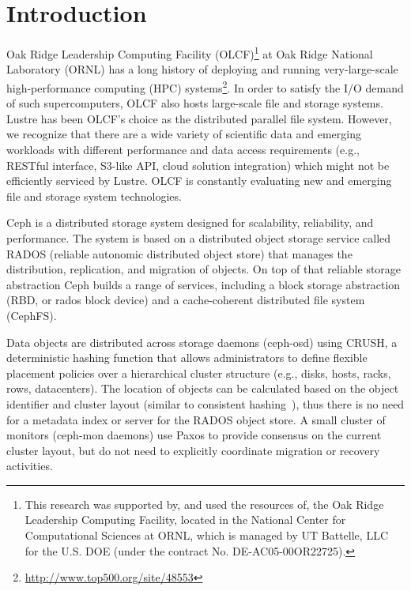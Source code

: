 \section{Introduction}

Oak Ridge Leadership Computing Facility (OLCF)\footnote{This research was
supported by, and used the resources of, the Oak Ridge Leadership Computing
Facility, located in the National Center for Computational Sciences at ORNL,
which is managed by UT Battelle, LLC for the U.S. DOE (under the contract No.
DE-AC05-00OR22725).} at Oak Ridge National Laboratory (ORNL) has a long history
of deploying and running very-large-scale high-performance computing (HPC)
systems\footnote{\url{http://www.top500.org/site/48553}}. 
In order to satisfy the I/O demand of such supercomputers, OLCF
also hosts large-scale file and storage systems. Lustre has been OLCF's choice
as the distributed parallel file system.  
However, we
recognize that there are a wide variety of scientific data and emerging
workloads with different performance and data access requirements (e.g., RESTful
interface, S3-like API, cloud solution integration) which might not be
efficiently serviced by Lustre. OLCF is constantly evaluating new and emerging
file and storage system technologies.  

Ceph\cite{Weil:2006:Ceph} is a distributed storage system designed for
scalability, reliability, and performance.  The system is based on a
distributed object storage service called RADOS (reliable autonomic distributed
object store) that manages the distribution, replication, and migration of
objects.  On top of that reliable storage abstraction Ceph builds a range of
services, including a block storage abstraction (RBD, or rados block device)
and a cache-coherent distributed file system (CephFS).

Data objects are distributed across storage daemons (ceph-osd) using
CRUSH\cite{Weil:2006:Crush}, a deterministic hashing function that allows
administrators to define flexible placement policies over a hierarchical
cluster structure (e.g., disks, hosts, racks, rows, datacenters).  The
location of objects can be calculated based on the object identifier and
cluster layout (similar to consistent hashing~\cite{karger1997consistent}),
thus there is no need for a metadata index or server for the RADOS object store.
A small cluster of monitors (ceph-mon daemons) use Paxos to provide consensus on
the current cluster layout, but do not need to explicitly coordinate migration
or recovery activities.

